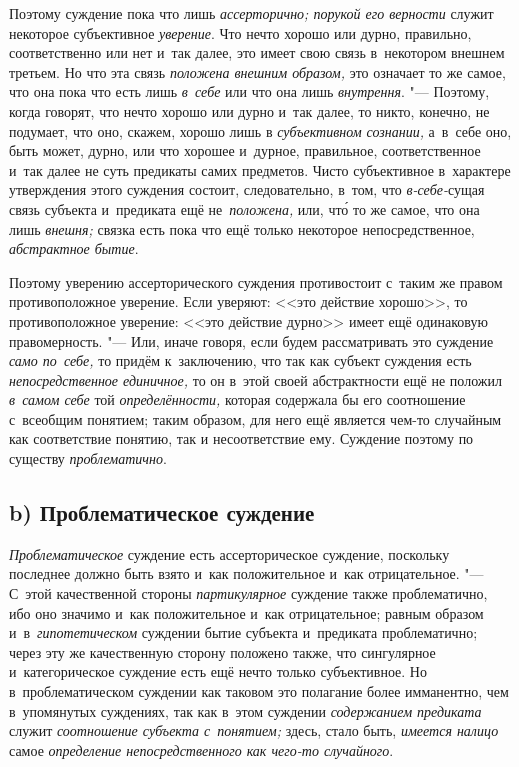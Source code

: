 Поэтому суждение пока что лишь {\em ассерторично; порукой его верности}
служит некоторое субъективное {\em уверение}. Что нечто
хорошо или дурно, правильно, соответственно или нет и~так далее, это имеет
свою связь в~некотором внешнем третьем. Но что эта связь
{\em положена внешним образом,}
это означает то же самое, что она пока что есть лишь
{\em в~себе} или что она лишь {\em внутрення}. "---
Поэтому, когда говорят, что нечто хорошо или дурно и~так
далее, то никто, конечно, не подумает, что оно, скажем, хорошо лишь в
{\em субъективном сознании,}
а~в~себе оно, быть может, дурно, или что хорошее и~дурное,
правильное, соответственное и~так далее не суть предикаты самих предметов.
Чисто субъективное в~характере утверждения этого суждения состоит,
следовательно, в~том, что {\em в-себе-}сущая связь субъекта и~предиката ещё
не~{\em положена,} или, чт\'{о} то же самое, что она лишь {\em внешня;} связка
есть пока что ещё только некоторое непосредственное, {\em абстрактное бытие}.

Поэтому уверению ассерторического суждения противостоит с~таким
же правом противоположное уверение. Если уверяют: <<это действие
хорошо>>, то противоположное уверение: <<это действие дурно>> имеет ещё
одинаковую правомерность. "--- Или, иначе говоря, если будем
рассматривать это суждение {\em само по~себе,} то придём к~заключению, что
так как субъект суждения есть {\em непосредственное единичное,} то он в~этой
своей абстрактности ещё не положил {\em в~самом себе} той {\em определённости,}
которая содержала бы его соотношение с~всеобщим понятием; таким образом,
для него ещё является чем-то случайным как соответствие понятию, так и
несоответствие ему. Суждение поэтому по существу {\em проблематично}.

\subsection[b) Проблематическое суждение]{b) Проблематическое суждение}

{\em Проблематическое} суждение есть ассерторическое суждение, поскольку
последнее должно быть взято и~как положительное и~как отрицательное. "---
С~этой качественной стороны {\em партикулярное}
суждение также проблематично, ибо оно значимо и~как
положительное и~как отрицательное; равным образом и~в~{\em гипотетическом}
суждении бытие субъекта и~предиката проблематично; через эту
же качественную сторону положено также, что сингулярное и~категорическое
суждение есть ещё нечто только субъективное. Но в~проблематическом суждении
как таковом это полагание более имманентно, чем в~упомянутых суждениях, так
как в~этом суждении {\em содержанием предиката} служит {\em соотношение
субъекта с~понятием;} здесь, стало быть, {\em имеется налицо} самое
{\em определение непосредственного как чего-то случайного}.


